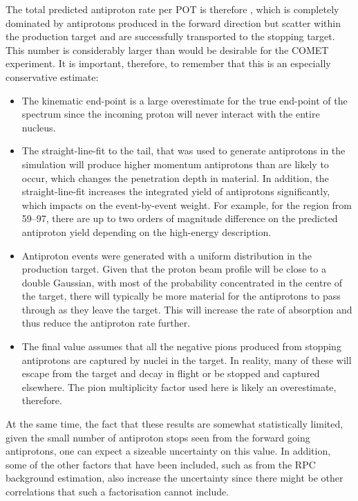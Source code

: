 The total predicted antiproton rate per \ac{POT} is therefore \VarBgAntiprotonsPerPOT, which is completely dominated by antiprotons produced in the forward direction but scatter within the production target and are successfully transported to the stopping target.
This number is considerably larger than would be desirable for the COMET experiment.
It is important, therefore, to remember that this is an especially conservative estimate:
\begin{itemize}
\item The kinematic end-point is a large overestimate for the true end-point of the spectrum since the incoming proton will never interact with the entire nucleus.  
\item The straight-line-fit to the tail, that was used to generate antiprotons in the simulation will produce higher momentum antiprotons than are likely to occur, which changes the penetration depth in material.
      In addition, the straight-line-fit increases the integrated yield of antiprotons significantly, which impacts on the event-by-event weight.
      For example, for the region from  59--97\degree, there are up to two orders of magnitude difference on the predicted antiproton yield depending on the high-energy description.
\item Antiproton events were generated with a uniform distribution in the production target. Given that the proton beam profile will be close to a double Gaussian, with most of the probability concentrated in the centre of the target, there will typically be more material for the antiprotons to pass through as they leave the target.  This will increase the rate of absorption and thus reduce the antiproton rate further.
\item The final value assumes that all the negative pions produced from stopping antiprotons are captured by nuclei in the target.  In reality, many of these will escape from the target and decay in flight or be stopped and captured elsewhere.  The pion multiplicity factor used here is likely an overestimate, therefore.
\end{itemize}
At the same time, the fact that these results are somewhat statistically limited, given the small number of antiproton stops seen from the forward going antiprotons, one can expect a sizeable uncertainty on this value.
In addition, some of the other factors that have been included, such as from the RPC background estimation, also increase the uncertainty since there might be other correlations that such a factorisation cannot include.

